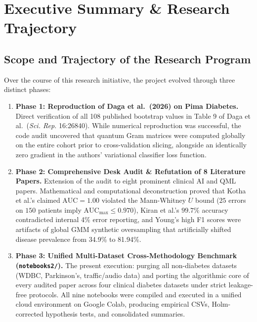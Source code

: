 \documentclass[11pt,a4paper]{article}
\begin{document}
\tableofcontents
\clearpage

\section{Executive Summary \& Research Trajectory}

\subsection{Scope and Trajectory of the Research Program}
Over the course of this research initiative, the project evolved through three distinct phases:
\begin{enumerate}[leftmargin=1.5em]
    \item \textbf{Phase 1: Reproduction of Daga et al.\ (2026) on Pima Diabetes.} Direct verification of all 108 published bootstrap values in Table 9 of Daga et al.\ (\emph{Sci. Rep.} 16:26840). While numerical reproduction was successful, the code audit uncovered that quantum Gram matrices were computed globally on the entire cohort prior to cross-validation slicing, alongside an identically zero gradient in the authors' variational classifier loss function.
    \item \textbf{Phase 2: Comprehensive Desk Audit \& Refutation of 8 Literature Papers.} Extension of the audit to eight prominent clinical AI and QML papers. Mathematical and computational deconstruction proved that Kotha et al.'s claimed $\text{AUC}=1.00$ violated the Mann-Whitney $U$ bound ($25$ errors on $150$ patients imply $\text{AUC}_{\max} \le 0.970$), Kiran et al.'s $99.7\%$ accuracy contradicted internal 4\% error reporting, and Young's high F1 scores were artifacts of global GMM synthetic oversampling that artificially shifted disease prevalence from 34.9\% to 81.94\%.
    \item \textbf{Phase 3: Unified Multi-Dataset Cross-Methodology Benchmark (\texttt{notebooks2/}).} The present execution: purging all non-diabetes datasets (WDBC, Parkinson's, traffic/audio data) and porting the algorithmic core of every audited paper across four clinical diabetes datasets under strict leakage-free protocols. All nine notebooks were compiled and executed in a unified cloud environment on Google Colab, producing empirical CSVs, Holm-corrected hypothesis tests, and consolidated summaries.
\end{enumerate}
\end{document}
